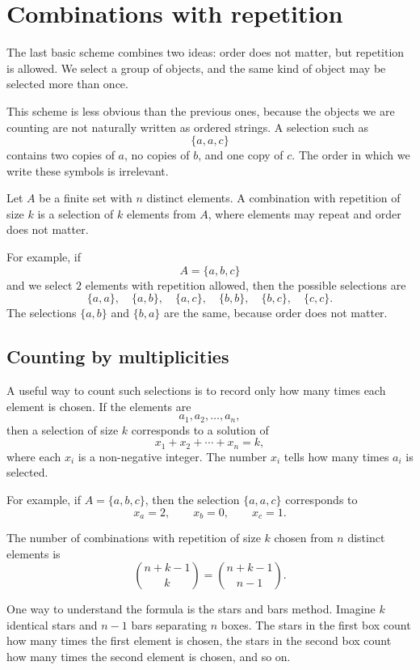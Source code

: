 \section{Combinations with repetition}

The last basic scheme combines two ideas: order does not matter, but repetition is allowed. We select a group of objects, and the same kind of object may be selected more than once.

This scheme is less obvious than the previous ones, because the objects we are counting are not naturally written as ordered strings. A selection such as
\[
\{a,a,c\}
\]
contains two copies of \(a\), no copies of \(b\), and one copy of \(c\). The order in which we write these symbols is irrelevant.

\begin{definitionbox}
Let \(A\) be a finite set with \(n\) distinct elements. A combination with repetition of size \(k\) is a selection of \(k\) elements from \(A\), where elements may repeat and order does not matter.
\end{definitionbox}

For example, if
\[
A=\{a,b,c\}
\]
and we select \(2\) elements with repetition allowed, then the possible selections are
\[
\{a,a\},\quad \{a,b\},\quad \{a,c\},\quad \{b,b\},\quad \{b,c\},\quad \{c,c\}.
\]
The selections \(\{a,b\}\) and \(\{b,a\}\) are the same, because order does not matter.

\subsection*{Counting by multiplicities}

A useful way to count such selections is to record only how many times each element is chosen. If the elements are
\[
a_1,a_2,\ldots,a_n,
\]
then a selection of size \(k\) corresponds to a solution of
\[
x_1+x_2+\cdots+x_n=k,
\]
where each \(x_i\) is a non-negative integer. The number \(x_i\) tells how many times \(a_i\) is selected.

For example, if \(A=\{a,b,c\}\), then the selection \(\{a,a,c\}\) corresponds to
\[
x_a=2,\qquad x_b=0,\qquad x_c=1.
\]

\begin{theorembox}
The number of combinations with repetition of size \(k\) chosen from \(n\) distinct elements is
\[
\binom{n+k-1}{k}=\binom{n+k-1}{n-1}.
\]
\end{theorembox}

One way to understand the formula is the stars and bars method. Imagine \(k\) identical stars and \(n-1\) bars separating \(n\) boxes. The stars in the first box count how many times the first element is chosen, the stars in the second box count how many times the second element is chosen, and so on.

